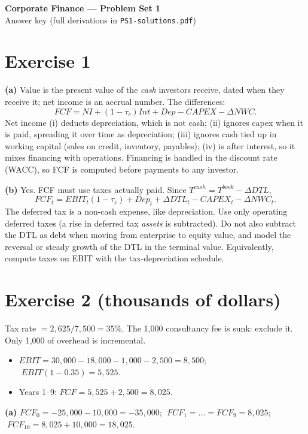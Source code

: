 \documentclass[11pt,a4paper]{article}
\begin{document}
\begin{center}
  {\Large\bfseries Corporate Finance --- Problem Set 1}\\[4pt]
  {\large Answer key (full derivations in \texttt{PS1-solutions.pdf})}
\end{center}

\section*{Exercise 1}

\textbf{(a)} Value is the present value of the \emph{cash} investors receive, dated when they
receive it; net income is an accrual number. The differences:
$$FCF = NI + (1-\tau_c)Int + Dep - CAPEX - \Delta NWC .$$
Net income (i) deducts depreciation, which is not cash; (ii) ignores capex when it is paid, spreading
it over time as depreciation; (iii) ignores cash tied up in working capital (sales on credit,
inventory, payables); (iv) is after interest, so it mixes financing with operations. Financing is
handled in the discount rate (WACC), so FCF is computed before payments to any investor.

\textbf{(b)} Yes. FCF must use taxes actually paid. Since
$T^{cash} = T^{book} - \Delta DTL$,
$$FCF_t = EBIT_t(1-\tau_c) + Dep_t + \Delta DTL_t - CAPEX_t - \Delta NWC_t .$$
The deferred tax is a non-cash expense, like depreciation. Use only operating deferred taxes (a rise
in deferred tax \emph{assets} is subtracted). Do not also subtract the DTL as debt when moving from
enterprise to equity value, and model the reversal or steady growth of the DTL in the terminal value.
Equivalently, compute taxes on EBIT with the tax-depreciation schedule.

\section*{Exercise 2 \normalsize(thousands of dollars)}

Tax rate $=2{,}625/7{,}500=35\%$. The 1{,}000 consultancy fee is sunk: exclude it. Only 1{,}000 of
overhead is incremental.
\begin{itemize}[leftmargin=1.4em]
  \item $EBIT = 30{,}000-18{,}000-1{,}000-2{,}500 = 8{,}500$; $\;EBIT(1-0.35)=5{,}525$.
  \item Years 1--9: $FCF = 5{,}525 + 2{,}500 = 8{,}025$.
\end{itemize}

\textbf{(a)} $FCF_0 = -25{,}000-10{,}000 = -35{,}000$; $\;FCF_1=\dots=FCF_9 = 8{,}025$;
$\;FCF_{10} = 8{,}025+10{,}000 = 18{,}025$.
\end{document}
